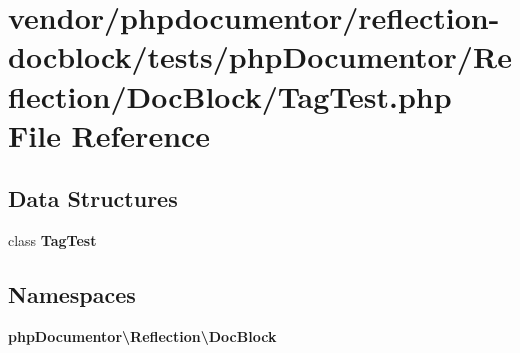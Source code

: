\section{vendor/phpdocumentor/reflection-\/docblock/tests/php\+Documentor/\+Reflection/\+Doc\+Block/\+Tag\+Test.php File Reference}
\label{_tag_test_8php}
\subsection*{Data Structures}
\begin{DoxyCompactItemize}
\item 
class {\bf Tag\+Test}
\end{DoxyCompactItemize}
\subsection*{Namespaces}
\begin{DoxyCompactItemize}
\item 
 {\bf php\+Documentor\textbackslash{}\+Reflection\textbackslash{}\+Doc\+Block}
\end{DoxyCompactItemize}
